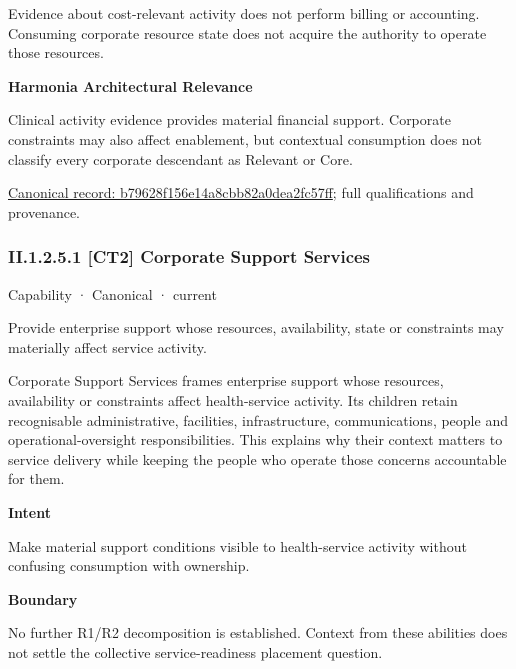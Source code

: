 Evidence about cost-relevant activity does not perform billing or accounting. Consuming corporate resource state does not acquire the authority to operate those resources.



\textbf{Harmonia Architectural Relevance}



Clinical activity evidence provides material financial support. Corporate constraints may also affect enablement, but contextual consumption does not classify every corporate descendant as Relevant or Core.


{\footnotesize \href{../../../../continuum/strategy/capability/b79628f156e14a8cbb82a0dea2fc57ff.md}{Canonical record: b79628f156e14a8cbb82a0dea2fc57ff}; full qualifications and provenance.}\par
\subsubsection*{II.1.2.5.1 [CT2] Corporate Support Services}
\label{navigation:II.1.2.5.1}

\label{element:c8777bccbe304e36b7d9fbd955d67579}
{\small Capability · Canonical · current}\par

Provide enterprise support whose resources, availability, state or constraints may materially affect service activity.



Corporate Support Services frames enterprise support whose resources, availability or constraints affect health-service activity. Its children retain recognisable administrative, facilities, infrastructure, communications, people and operational-oversight responsibilities. This explains why their context matters to service delivery while keeping the people who operate those concerns accountable for them.



\textbf{Intent}



Make material support conditions visible to health-service activity without confusing consumption with ownership.



\textbf{Boundary}



No further R1/R2 decomposition is established. Context from these abilities does not settle the collective service-readiness placement question.


